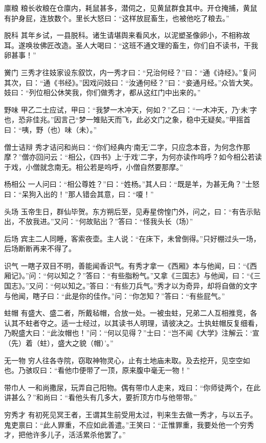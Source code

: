 \documentclass[12pt,UTF8]{ctexbook}
\begin{document}
廪粮
粮长收粮在仓廪内，耗鼠甚多，潜伺之，见黄鼠群食其中。开仓掩捕，黄鼠有护身屁，连放数个。里长大怒曰：“这样放屁畜生，也被他吃了粮去。”

脱科
其年乡试，一县脱科。诸生请堪舆来看风水，以泥塑圣像卵小，不相称故耳。遂唤妆佛匠改造。圣人大喝曰：“这班不通文理的畜生，你们自不读书，干我卵甚事！”

黉门
三秀才往妓家设东叙饮，内一秀才曰：“兄治何经？”曰：“通《诗经》。”复问其次，曰：“通《书经》。”因戏问妓曰：“汝通何经？”曰：“妾通月经。”众皆大笑。妓曰：“列位相公休笑我，你们做秀才，都从这红门中出来的。”

野味
甲乙二士应试，甲曰：“我梦一木冲天，何如？”乙曰：“一木冲天，乃‘未’字也，恐非佳兆。”因言己“梦一雉贴天而飞，此必文门之象，稳中无疑矣。”甲摇首曰：“咦，野（也）味（未）。”

僧士诘辩
秀才诘问和尚曰：“你们经典内‘南无’二字，只应念本音，为何念作那摩？”僧亦回问云：“相公，《四书》上‘于戏’二字，为何亦读作呜呼？如今相公若读于戏，小僧就念南无。相公若是呜呼，小僧自然要那摩。”

杨相公
一人问曰：“相公尊姓？”曰：“姓杨。”其人曰：“既是羊，为甚无角？”士怒曰：“呆狗入出的！”那人错会其意，曰：“嗄！”

头场
玉帝生日，群仙毕贺。东方朔后至，见寿星傍惶门外，问之，曰：“有告示贴出，不放我进。”又问：“何故贴出？”答曰：“怪我头长（场）”

后场
宾主二人同睡，客索夜壶。主人说：“在床下，未曾倒得。”只好棚过头一场，后场断断再来不得了。

识气
一瞎子双目不明，善能闻香识气。有秀才拿一《西厢》本与他闻，曰：“《西厢记》。”问：“何以知之？”答曰：“有些脂粉气。”又拿《三国志》与他闻，曰：“《三国志》。”又问：“何以知之。”答曰：“有些刀兵气。”秀才以为奇异，却将自做的文字与他闻，瞎子曰：“此是你的佳作。”问：“你怎知？”答曰：“有些屁气。”

蛀帽
有盛大、盛二者，所戴毡帽，合放一处。一被虫蛀，兄弟二人互相推竞，各认其不蛀者夺之。适一士经过，以其读书人明理，请彼决之。士执蛀帽反复细看，乃睨盛大曰：“此汝帽也！”问：“何以见得？”士曰：“岂不闻《大学》注解云：‘宣（先）着（蛀），盛大之貌（帽）’。”

无一物
穷人往各寺院，窃取神物灵心，止有土地庙未取。及去挖开，见空空如也。乃骇叹曰：“看他巾便带了一顶，原来腹中毫无一物！”

带巾人
一和尚撒尿，玩弄自己阳物。偶有带巾人走来，戏曰：“你师徒两个，在此讲甚么？”和尚曰：“看他头有几多大，要折顶方巾与他带带。”

穷秀才
有初死见冥王者，王谓其生前受用太过，判来生去做一秀才，与以五子。鬼吏禀曰：“此人罪重，不应如此善遣。”王笑曰：“正惟罪重，我要处他一个穷秀才，把他许多儿子，活活累杀他罢了。”
\end{document}
